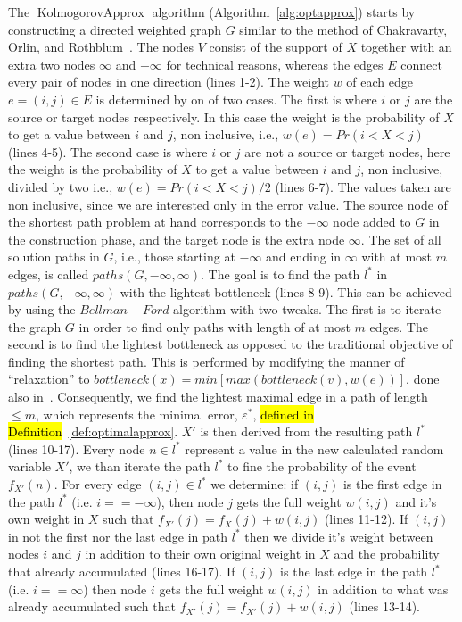 \documentclass{article}
\DeclareMathOperator{\KlmApprox}{KolmogorovApprox}
\begin{document}
The $\KlmApprox$ algorithm (Algorithm~\ref{alg:optapprox}) starts by constructing a directed weighted graph $G$ similar to the method of Chakravarty, Orlin, and Rothblum~\cite{chakravarty1982partitioning}. The nodes $V$ consist of the support of $X$ together with an extra two nodes $\infty$ and $-\infty$ for technical reasons, whereas the edges $E$ connect every pair of nodes in one direction (lines 1-2). The weight $w$ of each edge $e=(i,j)\in E$ is determined by on of two cases. The first is where $i$ or $j$ are the source or target nodes respectively. In this case the weight is the probability of $X$ to get a value between $i$ and $j$, non inclusive, i.e., $w(e)=Pr(i<X<j)$ (lines 4-5). The second case is where $i$ or $j$ are not a source or target nodes, here the weight is the probability of $X$ to get a value between $i$ and $j$, non inclusive, divided by two i.e., $w(e)=Pr(i<X<j)/2$ (lines 6-7). The values taken are non inclusive, since we are interested only in the error value.
The source node of the shortest path problem at hand corresponds to the $-\infty$ node added to $G$ in the construction phase, and the target node is the extra node $\infty$.
The set of all solution paths in $G$, i.e., those starting at $-\infty$ and ending in $\infty$ with at most $m$ edges, is called $paths(G, -\infty, \infty)$. The goal is to find the path $l^*$ in $paths(G, -\infty, \infty)$ with the lightest bottleneck (lines 8-9). This can be achieved by using the $Bellman-Ford$ algorithm with two tweaks. The first is to iterate the graph $G$ in order to find only paths with length of at most $m$ edges. The second is to find the lightest bottleneck as opposed to the traditional objective of finding the shortest path. This is performed by modifying the manner of ``relaxation'' to $bottleneck(x) = min[max(bottleneck(v),w(e))]$, done also in~\cite{shufan2011two}. Consequently, we find the lightest maximal edge in a path of length $\leq m$, which represents the minimal error, $\varepsilon^*$, \hl{defined in Definition}~\ref{def:optimalapprox}. $X'$ is then derived from the resulting path $l^*$ (lines 10-17). Every node $n \in l^*$ represent a value in the new calculated random variable $X'$, we than iterate the path $l^*$ to fine the probability of the event $f_{X'}(n)$. For every edge $(i,j)\in l^*$ we determine: if $(i,j)$ is the first edge in the path $ l^*$ (i.e.  $i==-\infty$), then node $j$ gets the full weight $w(i,j)$ and it's own weight in $X$ such that $f_{X'}(j) = f_{X}(j) +  w(i,j)$ (lines 11-12). If $(i,j)$ in not the first nor the last edge in path $l^*$ then we divide it's weight between nodes $i$ and $j$ in addition to their own original weight in $X$ and the probability that already accumulated (lines 16-17). If $(i,j)$ is the last edge in the path $ l^*$ (i.e.  $i==\infty$) then node $i$ gets the full weight $w(i,j)$ in addition to what was already accumulated such that $f_{X'}(j) = f_{X'}(j) +  w(i,j)$ (lines 13-14).
\end{document}
